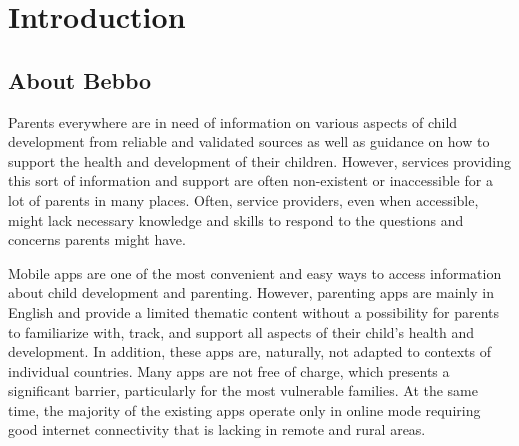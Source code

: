 \documentclass{article}
\begin{document}






\section*{Introduction}



\subsection*{About Bebbo}
Parents everywhere are in need of information on various aspects of child development from reliable  and validated sources as well as guidance on how to support the health and development of their  children. However, services providing this sort of information and support are often non-existent or  inaccessible for a lot of parents in many places. Often, service providers, even when accessible, might  lack necessary knowledge and skills to respond to the questions and concerns parents might have.

Mobile apps are one of the most convenient and easy ways to access information about child  development and parenting. However, parenting apps are mainly in English and provide a limited  thematic content without a possibility for parents to familiarize with, track, and support all aspects of  their child’s health and development. In addition, these apps are, naturally, not adapted to contexts of  individual countries. Many apps are not free of charge, which presents a significant barrier, particularly  for the most vulnerable families. At the same time, the majority of the existing apps operate only in  online mode requiring good internet connectivity that is lacking in remote and rural areas.
\end{document}
